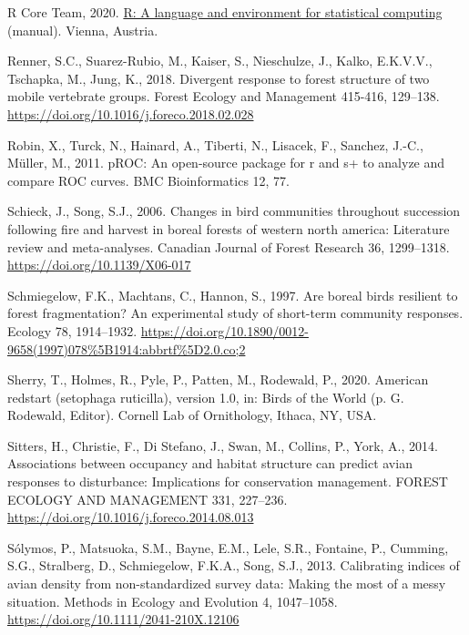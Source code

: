 \documentclass[
  12pt,
]{article}
\newlength{\cslhangindent}
\newlength{\cslentryspacingunit} %
\newenvironment{CSLReferences}[2] %
 {%
  \setlength{\parindent}{0pt}
  \ifodd #1
  \let\oldpar\par
  \def\par{\hangindent=\cslhangindent\oldpar}
  \fi
  \setlength{\parskip}{#2\cslentryspacingunit}
 }%
 {}
\begin{document}
\begin{CSLReferences}{1}{0}
\leavevmode{}%
R Core Team, 2020. \href{https://www.R-project.org/}{R: A language and environment for statistical computing} (manual). Vienna, Austria.

\leavevmode{}%
Renner, S.C., Suarez-Rubio, M., Kaiser, S., Nieschulze, J., Kalko, E.K.V.V., Tschapka, M., Jung, K., 2018. Divergent response to forest structure of two mobile vertebrate groups. Forest Ecology and Management 415-416, 129--138. \url{https://doi.org/10.1016/j.foreco.2018.02.028}

\leavevmode{}%
Robin, X., Turck, N., Hainard, A., Tiberti, N., Lisacek, F., Sanchez, J.-C., Müller, M., 2011. {pROC}: An open-source package for r and s+ to analyze and compare {ROC} curves. {BMC} Bioinformatics 12, 77.

\leavevmode{}%
Schieck, J., Song, S.J., 2006. Changes in bird communities throughout succession following fire and harvest in boreal forests of western north america: Literature review and meta-analyses. Canadian Journal of Forest Research 36, 1299--1318. \url{https://doi.org/10.1139/X06-017}

\leavevmode{}%
Schmiegelow, F.K., Machtans, C., Hannon, S., 1997. Are boreal birds resilient to forest fragmentation? An experimental study of short-term community responses. Ecology 78, 1914--1932. \url{https://doi.org/10.1890/0012-9658(1997)078\%5B1914:abbrtf\%5D2.0.co;2}

\leavevmode{}%
Sherry, T., Holmes, R., Pyle, P., Patten, M., Rodewald, P., 2020. American redstart (setophaga ruticilla), version 1.0, in: Birds of the World (p. G. Rodewald, Editor). Cornell Lab of Ornithology, Ithaca, {NY}, {USA}.

\leavevmode{}%
Sitters, H., Christie, F., Di Stefano, J., Swan, M., Collins, P., York, A., 2014. Associations between occupancy and habitat structure can predict avian responses to disturbance: Implications for conservation management. {FOREST} {ECOLOGY} {AND} {MANAGEMENT} 331, 227--236. \url{https://doi.org/10.1016/j.foreco.2014.08.013}

\leavevmode{}%
Sólymos, P., Matsuoka, S.M., Bayne, E.M., Lele, S.R., Fontaine, P., Cumming, S.G., Stralberg, D., Schmiegelow, F.K.A., Song, S.J., 2013. Calibrating indices of avian density from non-standardized survey data: Making the most of a messy situation. Methods in Ecology and Evolution 4, 1047--1058. \url{https://doi.org/10.1111/2041-210X.12106}


\end{CSLReferences}
\end{document}
